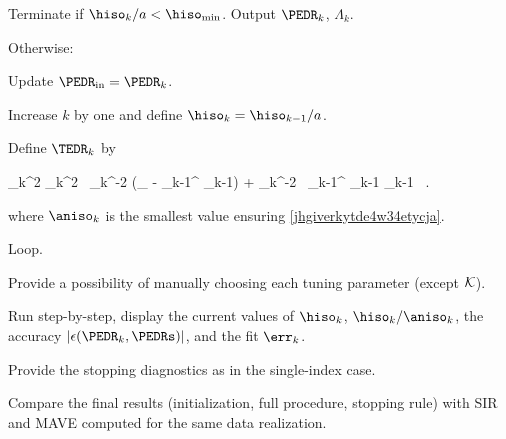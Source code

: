 \begin{mylist}
\item
Terminate if \( \hiso_{k}/a < \hiso_{\min} \).
Output \( \PEDR_{k} \), \( \Lambda_{k} \).

\item 
Otherwise:
\begin{mylist}


\item
Update \( \PEDR_{\init} = \PEDR_{k} \).

\item
Increase \( k \) by one and define \( \hiso_{k} = \hiso_{k-1} / a \).


\item
Define \( \TEDR_{k} \) by
\begin{EQA}[c]
	\TEDR_{k}^{2}
	\eqdef
	\aniso_{k}^{2} \, \hiso_{k}^{-2} (\Id_{\dimd} - \PEDR_{k-1}^{\T} \PEDR_{k-1}) 
	+ \hiso_{k}^{-2} \, \PEDR_{k-1}^{\T} \Lambda_{k-1} \PEDR_{k-1}
	\, .
\end{EQA}
where \( \aniso_{k} \) is the smallest value ensuring \eqref{jhgiverkytde4w34etycja}.
\end{mylist}
\item Loop.
\end{mylist}

{\color{blue} 
\begin{mylist}
\item
Provide a possibility of manually choosing each tuning parameter (except \( \mathcal{K} \)).

\item
Run step-by-step, display the current values of \( \hiso_{k} \), \( \hiso_{k} /  \aniso_{k} \),
the accuracy \( |\epsilon(\PEDR_{k},\PEDRs)| \), and the fit \( \err_{k} \).


\item
Provide the stopping diagnostics as in the single-index case.

\item
Compare the final results (initialization, full procedure, stopping rule) with 
SIR and MAVE computed for the same data realization.

%

\end{mylist}

}
